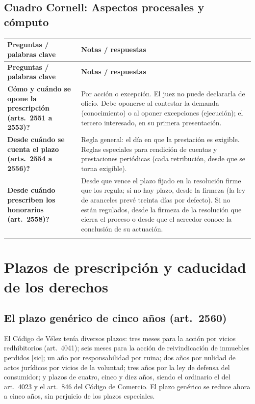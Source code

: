 \documentclass[12pt,oneside]{book}
\newenvironment{cornell}{%
  \par\medskip\noindent
  \begin{longtable}{>{\raggedright\arraybackslash}p{0.25\textwidth}>{\raggedright\arraybackslash}p{0.69\textwidth}}
  \toprule
  \textbf{Preguntas / palabras clave} & \textbf{Notas / respuestas} \\
  \midrule
  \endfirsthead
  \toprule
  \textbf{Preguntas / palabras clave} & \textbf{Notas / respuestas} \\
  \midrule
  \endhead
}{%
  \bottomrule
  \end{longtable}
}
\newcommand{\cq}[2]{\textbf{#1} & #2 \\ \addlinespace[0.5em]}
\newcommand{\cresumen}[1]{\midrule \multicolumn{2}{p{0.94\textwidth}}{\textbf{Resumen:} #1} \\}
\begin{document}
\section*{Cuadro Cornell: Aspectos procesales y c\'omputo}

\begin{cornell}
\cq{\textquestiondown C\'omo y cu\'ando se opone la prescripci\'on (arts.\ 2551 a 2553)?}{Por acci\'on o excepci\'on. El juez no puede declararla de oficio. Debe oponerse al contestar la demanda (conocimiento) o al oponer excepciones (ejecuci\'on); el tercero interesado, en su primera presentaci\'on.}
\cq{\textquestiondown Desde cu\'ando se cuenta el plazo (arts.\ 2554 a 2556)?}{Regla general: el d\'ia en que la prestaci\'on es exigible. Reglas especiales para rendici\'on de cuentas y prestaciones peri\'odicas (cada retribuci\'on, desde que se torna exigible).}
\cq{\textquestiondown Desde cu\'ando prescriben los honorarios (art.\ 2558)?}{Desde que vence el plazo fijado en la resoluci\'on firme que los regula; si no hay plazo, desde la firmeza (la ley de aranceles prev\'e treinta d\'ias por defecto). Si no est\'an regulados, desde la firmeza de la resoluci\'on que cierra el proceso o desde que el acreedor conoce la conclusi\'on de su actuaci\'on.}
\cresumen{La prescripci\'on se articula por acci\'on o excepci\'on, nunca de oficio, en una oportunidad precisa. El plazo comienza, en general, cuando la prestaci\'on es exigible, con reglas propias para rendici\'on de cuentas, prestaciones peri\'odicas y honorarios.}
\end{cornell}

\chapter[Plazos de prescripci\'on y caducidad]{Plazos de prescripci\'on y caducidad de los derechos}

\section{El plazo gen\'erico de cinco a\~nos (art.\ 2560)}

El C\'odigo de V\'elez ten\'ia diversos plazos: tres meses para la acci\'on por vicios redhibitorios (art.\ 4041); seis meses para la acci\'on de reivindicaci\'on de inmuebles perdidos [sic]; un a\~no por responsabilidad por ruina; dos a\~nos por nulidad de actos jur\'idicos por vicios de la voluntad; tres a\~nos por la ley de defensa del consumidor; y plazos de cuatro, cinco y diez a\~nos, siendo el ordinario el del art.\ 4023 y el art.\ 846 del C\'odigo de Comercio. El plazo gen\'erico se reduce ahora a cinco a\~nos, sin perjuicio de los plazos especiales.
\end{document}
